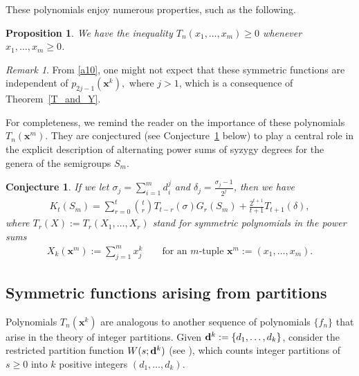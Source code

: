 \documentclass[11pt]{amsart}
\newtheorem{proposition}[theorem]{Proposition}
\newtheorem{conjecture}[theorem]{Conjecture}
\theoremstyle{definition}
\theoremstyle{remark}
\newtheorem*{remark}{Remark}
\numberwithin{equation}{section}
\def\bea{\begin{eqnarray}}
\def\eea{\end{eqnarray}}
\begin{document}
These polynomials enjoy numerous properties, such as the following.

\begin{proposition}\cite[Lm. 1.3]{Fel}
We have the inequality
$T_n(x_1,\ldots,x_m)\ge 0$ whenever $x_1,\ldots,x_m\ge 0$.
\end{proposition}

\begin{remark} From \eqref{a10}, one might not expect that these symmetric functions are independent of $p_{2j-1}(\pmb{x}^k),$ where $j>1$, which is a consequence of Theorem~\ref{T_and_Y}.
\end{remark}


For completeness, we remind the reader on the importance of these polynomials $T_n(\pmb{x}^m)$.
They are conjectured (see Conjecture~\ref{conj2.1} below) to play a central role in the explicit description of alternating power sums of syzygy degrees for the genera of the semigroups $S_m$.


\begin{conjecture} \label{conj2.1} If we let $\sigma_j=\sum_{i=1}^md_i^j$ and 
$\delta_j=\frac{\sigma_j-1}{2^j}$, then we have
\bea
K_t(S_m)=\sum_{r=0}^t \binom{t}r T_{t-r}(\sigma)G_r(S_m)+\frac{2^{t+1}}{t+1}T_{t+1} \label{a26}
(\delta),
\eea
where $T_r(X):=T_r(X_1,\dots,X_r)$ stand for symmetric polynomials in the power sums
\bea
X_k(\pmb{x}^m):=\sum_{j=1}^mx_j^k \qquad \text{for an $m$-tuple $\pmb{x}^m:=(x_1,\dots,x_m)$}. 
\label{a27}
\eea
\end{conjecture}

\smallskip



\subsection{Symmetric functions arising from partitions}\label{pr_section}


\smallskip

Polynomials $T_n(\pmb{x}^k)$ are analogous to another sequence of polynomials $\{f_n\}$ that arise in the theory of integer partitions. Given ${\bf d}^k:=\{d_1,\ldots,d_k\}$, consider the restricted partition function $W(s;{\bf d}^k)$ (see \cite{Andrews}), which counts integer partitions of $s\ge 0$ into $k$ positive integers $(d_1,\ldots,d_k).$
\end{document}
